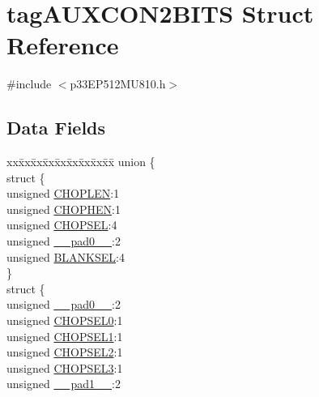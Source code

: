 \hypertarget{structtag_a_u_x_c_o_n2_b_i_t_s}{}\section{tag\+A\+U\+X\+C\+O\+N2\+B\+I\+TS Struct Reference}
\label{structtag_a_u_x_c_o_n2_b_i_t_s}


{\ttfamily \#include $<$p33\+E\+P512\+M\+U810.\+h$>$}

\subsection*{Data Fields}
\begin{DoxyCompactItemize}
\item 
\begin{tabbing}
xx\=xx\=xx\=xx\=xx\=xx\=xx\=xx\=xx\=\kill
union \{\\
\>struct \{\\
\>\>unsigned \hyperlink{structtag_a_u_x_c_o_n2_b_i_t_s_a3ef61325b83d3685e2364392dd43dd06}{CHOPLEN}:1\\
\>\>unsigned \hyperlink{structtag_a_u_x_c_o_n2_b_i_t_s_a38243e11a4372e45b55166fcec4322fa}{CHOPHEN}:1\\
\>\>unsigned \hyperlink{structtag_a_u_x_c_o_n2_b_i_t_s_aafc704d0a50b4ba0c019d33514cb7782}{CHOPSEL}:4\\
\>\>unsigned \hyperlink{structtag_a_u_x_c_o_n2_b_i_t_s_adf71f3d8410c1f1dbbc96680a92c49af}{\_\_pad0\_\_}:2\\
\>\>unsigned \hyperlink{structtag_a_u_x_c_o_n2_b_i_t_s_a16dd126500ffc8232d3b8e619c4406a2}{BLANKSEL}:4\\
\>\} \\
\>struct \{\\
\>\>unsigned \hyperlink{structtag_a_u_x_c_o_n2_b_i_t_s_adf71f3d8410c1f1dbbc96680a92c49af}{\_\_pad0\_\_}:2\\
\>\>unsigned \hyperlink{structtag_a_u_x_c_o_n2_b_i_t_s_acc4daaf21ff4590b40d3f25dad388167}{CHOPSEL0}:1\\
\>\>unsigned \hyperlink{structtag_a_u_x_c_o_n2_b_i_t_s_a5be3cb702a6c27dd28ee2f7bb142c88c}{CHOPSEL1}:1\\
\>\>unsigned \hyperlink{structtag_a_u_x_c_o_n2_b_i_t_s_ae9a19a5d1e40ae671a2b05fa09e77c10}{CHOPSEL2}:1\\
\>\>unsigned \hyperlink{structtag_a_u_x_c_o_n2_b_i_t_s_a6bcb1f80b40842c9ebd3c9d76d4c196f}{CHOPSEL3}:1\\
\>\>unsigned \hyperlink{structtag_a_u_x_c_o_n2_b_i_t_s_acaf2d0924a107ec6e8d2e31febaf66f9}{\_\_pad1\_\_}:2\\

\end{tabbing}
\end{DoxyCompactItemize}
